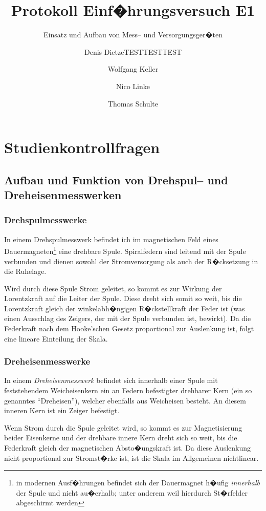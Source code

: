 \documentclass[10pt]{scrartcl}
\author{Denis DietzeTESTTESTTEST \and Wolfgang Keller \and Nico Linke \and Thomas Schulte}
\title{Protokoll Einf�hrungsversuch E1}
\subtitle{Einsatz und Aufbau von Mess-- und Versorgungsger�ten}
\begin{document}
\maketitle

\section{Studienkontrollfragen}

\subsection{Aufbau und Funktion von Drehspul-- und Dreheisenmesswerken}

\subsubsection{Drehspulmesswerke}

In einem Drehspulmesswerk befindet ich im magnetischen Feld eines Dauermagneten\footnote{in modernen Ausf�hrungen befindet sich der Dauermagnet h�ufig \emph{innerhalb} der Spule und nicht au�erhalb; unter anderem weil hierdurch St�rfelder abgeschirmt werden} eine drehbare Spule. Spiralfedern sind leitend mit der Spule verbunden und dienen sowohl der Stromversorgung als auch der R�cksetzung in die Ruhelage.

Wird durch diese Spule Strom geleitet, so kommt es zur Wirkung der Lorentzkraft auf die Leiter der Spule. Diese dreht sich somit so weit, bis die Lorentzkraft gleich der winkelabh�ngigen R�ckstellkraft der Feder ist (was einen Ausschlag des Zeigers, der mit der Spule verbunden ist, bewirkt). Da die Federkraft nach dem Hooke'schen Gesetz proportional zur Auslenkung ist, folgt eine lineare Einteilung der Skala.

\subsubsection{Dreheisenmesswerke}

In einem \emph{Dreheisenmesswerk} befindet sich innerhalb einer Spule mit feststehendem Weicheisenkern ein an Federn befestigter drehbarer Kern (ein so genanntes "`Dreheisen"'), welcher ebenfalls aus Weicheisen besteht. An diesem inneren Kern ist ein Zeiger befestigt.

Wenn Strom durch die Spule geleitet wird, so kommt es zur Magnetisierung beider Eisenkerne und der drehbare innere Kern dreht sich so weit, bis die Federkraft gleich der magnetischen Absto�ungskraft ist. Da diese Auslenkung nicht proportional zur Stromst�rke ist, ist die Skala im Allgemeinen nichtlinear.
\end{document}
